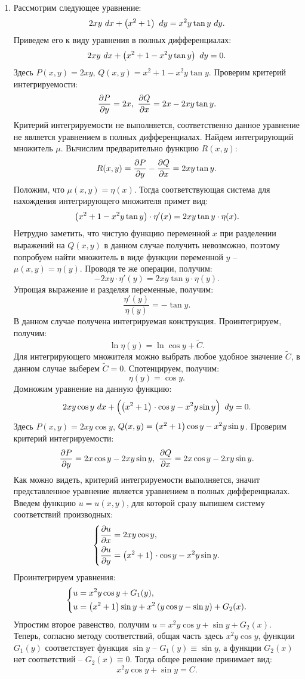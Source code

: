\begin{enumerate}
			\item Рассмотрим следующее уравнение:
				\[ 2xy ~ dx + \left( x^2 + 1 \right) ~ dy = x^2 y \tan{y} ~ dy. \]
				Приведем его к виду уравнения в полных дифференциалах:
				\[ 2xy ~ dx + \left( x^2 + 1 - x^2 y \tan{y} \right) ~ dy = 0. \]
				Здесь $P(x, y) = 2xy$, $Q(x, y) = x^2 + 1 - x^2 y \tan{y}$. Проверим критерий интегрируемости:
				\[ \dfrac{\partial P}{\partial y} = 2x, ~ \dfrac{\partial Q}{\partial x} = 2x - 2xy \tan{y}. \]
				Критерий интегрируемости не выполняется, соответственно данное уравнение не является уравнением в полных дифференциалах. Найдем интегрирующий множитель $\mu$. Вычислим предварительно функцию $R(x, y)$: 
				\[ R(x, y) = \dfrac{\partial P}{\partial y} - \dfrac{\partial Q}{\partial x} = 2xy \tan{y}. \]
				Положим, что $\mu(x, y) = \eta(x)$. Тогда соответствующая система для нахождения интегрирующего множителя примет вид:
				\[ \left( x^2 + 1 - x^2 y \tan{y} \right) \cdot \eta'(x) = 2xy \tan{y} \cdot \eta(x). \]
				Нетрудно заметить, что чистую функцию переменной $x$ при разделении выражений на $Q(x, y)$ в данном случае получить невозможно, поэтому попробуем найти множитель в виде функции переменной $y$ -- $\mu(x, y) = \eta(y)$. Проводя те же операции, получим:
				\[ -2xy \cdot \eta'(y) = 2xy \tan{y} \cdot \eta(y). \]
				Упрощая выражение и разделяя переменные, получим:
				\[ \frac{\eta'(y)}{\eta(y)} = -\tan{y}. \]
				В данном случае получена интегрируемая конструкция. Проинтегрируем, получим:
				\[ \ln{\eta(y)} = \ln{\cos{y}} + \tilde{C}. \]
				Для интегрирующего множителя можно выбрать любое удобное значение $\tilde{C}$, в данном случае выберем $\tilde{C} = 0$. Спотенцируем, получим:
				\[ \eta(y) = \cos{y}. \]
				Домножим уравнение на данную функцию:
				\[ 2xy \cos{y} ~ dx + \left( \left( x^2 + 1 \right)^{\vphantom{2}} \cdot \cos{y} - x^2 y \sin{y} \right) ~ dy = 0. \]
				Здесь $P(x, y) = 2xy \cos{y}$, $Q(x, y) = \left( x^2 + 1 \right) \cos{y} - x^2 y \sin{y}$. Проверим критерий интегрируемости:
				\[ \dfrac{\partial P}{\partial y} = 2x \cos{y} - 2xy \sin{y}, ~ \dfrac{\partial Q}{\partial x} = 2x \cos{y} - 2xy \sin{y}. \]
				Как можно видеть, критерий интегрируемости выполняется, значит представленное уравнение является уравнением в полных дифференциалах. Введем функцию $u = u(x, y)$, для которой сразу выпишем систему соответствий производных:
				\[ \left\lbrace \begin{split} \dfrac{\partial u}{\partial x} &= 2xy \cos{y}, \\ \dfrac{\partial u}{\partial y} &= \left( x^2 + 1 \right)^{\vphantom{2}} \cdot \cos{y} - x^2 y \sin{y}. \end{split} \right. \]
				Проинтегрируем уравнения:
				\[ \left\lbrace \begin{split} 
					u &= x^2 y \cos{y} + G_1(y), \\
					u &= \left( x^2 + 1 \right) \sin{y} + x^2 \left( y \cos{y} - \sin{y} \right) + G_2(x). 
				\end{split} \right.\]
				Упростим второе равенство, получим $u = x^2 y \cos{y} + \sin{y} + G_2(x)$. Теперь, согласно методу соответствий, общая часть здесь $x^2 y \cos{y}$, функции $G_1(y)$ соответствует функция $\sin{y}$ -- $G_1(y) \equiv \sin{y}$, а функции $G_2(x)$ нет соответствий -- $G_2(x) \equiv 0$. Тогда общее решение принимает вид:
				\[ x^2 y \cos{y} + \sin{y} = C. \]
		\end{enumerate}

	\pagebreak